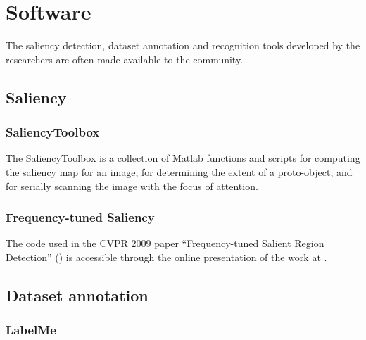 \section{Software}
\label{sec:soft}

The saliency detection, dataset annotation and recognition tools developed by the researchers are often made available to the community.

\subsection{Saliency}
\subsubsection{SaliencyToolbox}\label{subsec:saltool}
The SaliencyToolbox is a collection of Matlab functions and scripts for computing the saliency map for an image, for determining the extent of a proto-object, and for serially scanning the image with the focus of attention. 

\subsubsection{Frequency-tuned Saliency}
The code used in the CVPR 2009 paper ``Frequency-tuned Salient Region Detection'' (\cite{LCAV-CONF-2009-012}) is accessible through the online presentation of the work at \cite{achantaCVPR09}.

\subsection{Dataset annotation}
\subsubsection{LabelMe}\label{subsec:labelme}
\cite{Russell2008}